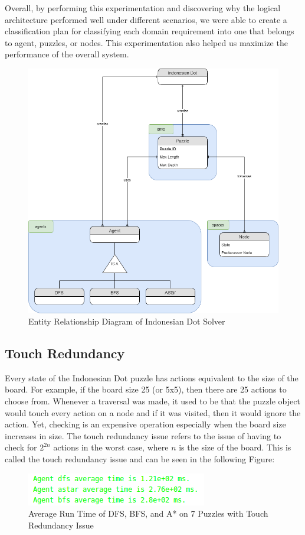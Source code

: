 Overall, by performing this experimentation and discovering why the logical architecture performed well under different scenarios, we were able to create a classification plan for classifying each domain requirement into one that belongs to agent, puzzles, or nodes. This experimentation also helped us maximize the performance of the overall system.

\begin{figure}[H]
\includegraphics[width=0.75\linewidth]{assets/schema.png}
\caption{Entity Relationship Diagram of Indonesian Dot Solver} \label{fig2}
\end{figure}

\subsection{Touch Redundancy}

Every state of the Indonesian Dot puzzle has actions equivalent to the size of the board. For example, if the board size 25 (or 5x5), then there are 25 actions to choose from. Whenever a traversal was made, it used to be that the puzzle object would touch every action on a node and if it was visited, then it would ignore the action. Yet, checking is an expensive operation especially when the board size increases in size. The touch redundancy issue refers to the issue of having to check for $2^{2n}$ actions in the worst case, where $n$ is the size of the board. This is called the touch redundancy issue and can be seen in the following Figure: 

\begin{figure}[H]
\includegraphics[width=0.75\linewidth]{assets/touch_redundancy.png}
\caption{Average Run Time of DFS, BFS, and A* on 7 Puzzles with Touch Redundancy Issue} \label{fig3}
\end{figure}


